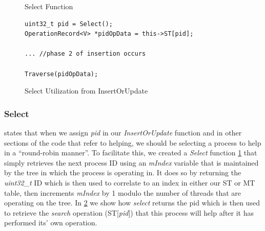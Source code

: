 \documentclass[letterpaper, 10 pt, conference]{ieeeconf}
\begin{document}
	\begin{figure}
		
		\caption{Select Function}
		\label{selectfunction}
	\end{figure}

\begin{figure}
\begin{lstlisting}
uint32_t pid = Select();
OperationRecord<V> *pidOpData = this->ST[pid];

... //phase 2 of insertion occurs

Traverse(pidOpData);
\end{lstlisting}
\caption{Select Utilization from InsertOrUpdate}
\label{selectfunctionexample}
\end{figure}

\subsubsection{Select}
\cite{c1} states that when we assign \textit{pid} in our \textit{InsertOrUpdate} function and in other sections of the code that refer to helping, we should be selecting a process to help in a ``round-robin manner''. To facilitate this, we created a \textit{Select} function \ref{selectfunction} that simply retrieves the next process ID using an \textit{mIndex} variable that is maintained by the tree in which the process is operating in. It does so by returning the \textit{uint32\_t} ID which is then used to correlate to an index in either our ST or MT table, then increments \textit{mIndex} by 1 modulo the number of threads that are operating on the tree. In \ref{selectfunctionexample} we show how \textit{select} returns the pid which is then used to retrieve the \textit{search} operation (ST[\textit{pid}]) that this process will help after it has performed its' own operation.
\end{document}

